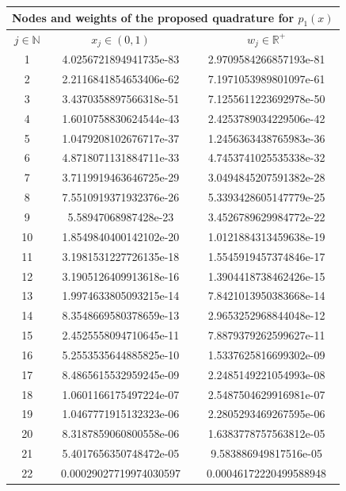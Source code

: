 \documentclass[a4paper, twosided]{book}
\begin{document}
\vspace{0.2cm}
\begin{table}[H]
\centering
\begin{tabular}{|c||c|c|}
\hline
\multicolumn{3}{|c|}{\textbf{Nodes and weights of the proposed quadrature for $p_1(x)$ }} \\
\hline
$j\in\mathbb{N}$ & $x_j\in(0,1)$ & $w_j\in\mathbb{R}^+$ \\
\hline
1   &  4.0256721894941735e-83  &  2.9709584266857193e-81  \\
2   &  2.2116841854653406e-62  &  7.1971053989801097e-61  \\
3   &  3.4370358897566318e-51  &  7.1255611223692978e-50  \\
4   &  1.6010758830624544e-43  &  2.4253789034229506e-42  \\
5   &  1.0479208102676717e-37  &  1.2456363438765983e-36  \\
6   &  4.8718071131884711e-33  &  4.7453741025535338e-32  \\
7   &  3.7119919463646725e-29  &  3.0494845207591382e-28  \\
8   &  7.5510919371932376e-26  &  5.3393428605147779e-25  \\
9   &  5.58947068987428e-23    &  3.4526789629984772e-22  \\
10  &  1.8549840400142102e-20  &  1.0121884313459638e-19  \\
11  &  3.1981531227726135e-18  &  1.5545919457374846e-17  \\
12  &  3.1905126409913618e-16  &  1.3904418738462426e-15  \\
13  &  1.9974633805093215e-14  &  7.8421013950383668e-14  \\
14  &  8.3548669580378659e-13  &  2.9653252968844048e-12  \\
15  &  2.4525558094710645e-11  &  7.8879379262599627e-11  \\
16  &  5.2553535644885825e-10  &  1.5337625816699302e-09  \\
17  &  8.4865615532959245e-09  &  2.2485149221054993e-08  \\
18  &  1.0601166175497224e-07  &  2.5487504629916981e-07  \\
19  &  1.0467771915132323e-06  &  2.2805293469267595e-06  \\
20  &  8.3187859060800558e-06  &  1.6383778757563812e-05  \\
21  &  5.4017656350748472e-05  &  9.583886949817516e-05   \\
22  &  0.00029027719974030597  &  0.00046172220499588948  \\

\end{tabular}
\end{table}
\end{document}
